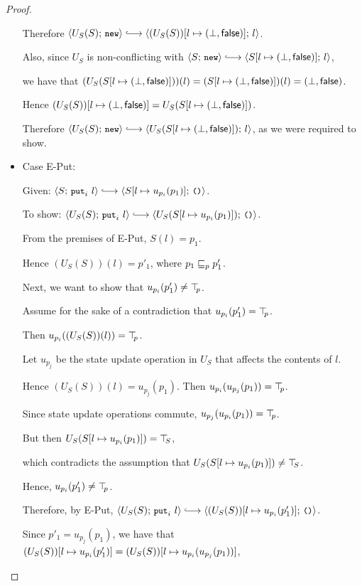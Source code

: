 \begin{proof}
\begin{itemize}
    Therefore $\config{U_S(S)}{\NEW} \parstepsto
    \config{\extS{(U_S(S))}{l}{\bot}{\frozenfalse}}{l}$.

    Also, since $U_S$ is non-conflicting with $\config{S}{\NEW}
    \parstepsto \config{\extS{S}{l}{\bot}{\frozenfalse}}{l}$,

    we have that $(U_S(S[l \mapsto (\bot, \textsf{false})]))(l) =
    (S[l \mapsto (\bot, \textsf{false})])(l) =
    (\bot, \textsf{false})$.

    Hence $(U_S(S))[l \mapsto (\bot, \textsf{false})] =
    U_S(S[l \mapsto (\bot, \textsf{false})])$.

    Therefore $\config{U_S(S)}{\NEW} \parstepsto
    \config{U_S(\extS{S}{l}{\bot}{\frozenfalse})}{l}$, as we were
    required to show.

  \item Case {\sc E-Put}:

    Given: $\config{S}{\putiexp{l}} \parstepsto
    \config{\extSRaw{S}{l}{u_{p_i}(p_1)}}{\unit}$.

    To show: $\config{U_S(S)}{\putiexp{l}} \parstepsto
    \config{U_S(\extSRaw{S}{l}{u_{p_i}(p_1)})}{\unit}$.

    From the premises of {\sc E-Put}, $S(l) = p_1$.

    Hence $(U_S(S))(l) = p'_1$, where $p_1 \sqsubseteq_p p'_1$.

    Next, we want to show that $u_{p_i}(p'_1) \neq \top\hspace{-0.85mm}_{p}$.

    Assume for the sake of a contradiction that $u_{p_i}(p'_1) =
    \top\hspace{-0.85mm}_{p}$.

    Then $u_{p_i}((U_S(S))(l)) = \top\hspace{-0.85mm}_{p}$.

    Let $u_{p_j}$ be the state update operation in $U_S$ that affects
    the contents of $l$.

    Hence $(U_S(S))(l) = u_{p_j}(p_1)$. Then $u_{p_i}(u_{p_j}(p_1)) =
    \top\hspace{-0.85mm}_{p}$.

    Since state update operations commute, $u_{p_j}(u_{p_i}(p_1)) =
    \top\hspace{-0.85mm}_{p}$.
    
    But then $U_S(S[l \mapsto u_{p_i}(p_1)]) = \top\hspace{-0.85mm}_{S}$,

    which contradicts the assumption that
    $U_S(S[l \mapsto u_{p_i}(p_1)]) \neq \top\hspace{-0.85mm}_{S}$.

    Hence, $u_{p_i}(p'_1) \neq \top\hspace{-0.85mm}_{p}$.

    Therefore, by {\sc E-Put}, $\config{U_S(S)}{\putiexp{l}}
    \parstepsto \config{\extSRaw{(U_S(S))}{l}{u_{p_i}(p'_1)}}{\unit}$.

    Since $p'_1 = u_{p_j}(p_1)$, we have that
    $(U_S(S))[l \mapsto u_{p_i}(p'_1)] =
    (U_S(S))[l \mapsto u_{p_i}(u_{p_j}(p_1))]$,


\end{itemize}
\end{proof}
